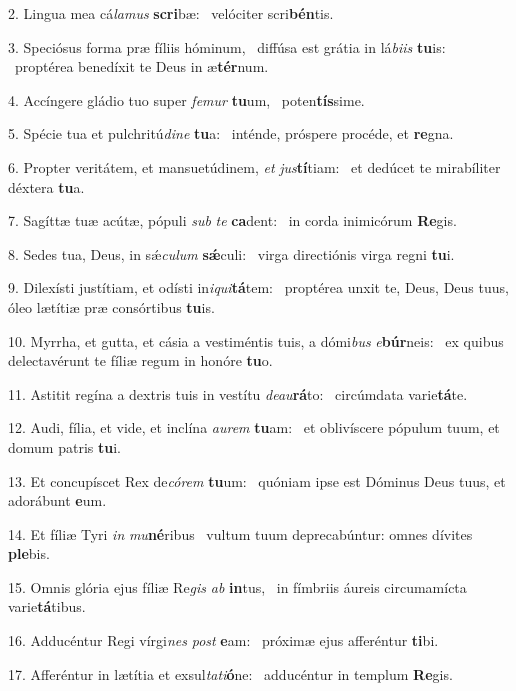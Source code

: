 2. Lingua mea cá\textit{la}\textit{mus} \textbf{scri}bæ: \ast\  velóciter scri\textbf{bén}tis.\

3. Speciósus forma præ fíliis hóminum, \dag\  diffúsa est grátia in lá\textit{bi}\textit{is} \textbf{tu}is: \ast\  proptérea benedíxit te Deus in æ\textbf{tér}num.\

4. Accíngere gládio tuo super \textit{fe}\textit{mur} \textbf{tu}um, \ast\  poten\textbf{tís}sime.\

5. Spécie tua et pulchritú\textit{di}\textit{ne} \textbf{tu}a: \ast\  inténde, próspere procéde, et \textbf{re}gna.\

6. Propter veritátem, et mansuetúdinem, \textit{et} \textit{jus}\textbf{tí}tiam: \ast\  et dedúcet te mirabíliter déxtera \textbf{tu}a.\

7. Sagíttæ tuæ acútæ, pópuli \textit{sub} \textit{te} \textbf{ca}dent: \ast\  in corda inimicórum \textbf{Re}gis.\

8. Sedes tua, Deus, in sǽ\textit{cu}\textit{lum} \textbf{sǽ}culi: \ast\  virga directiónis virga regni \textbf{tu}i.\

9. Dilexísti justítiam, et odísti in\textit{i}\textit{qui}\textbf{tá}tem: \ast\  proptérea unxit te, Deus, Deus tuus, óleo lætítiæ præ consórtibus \textbf{tu}is.\

10. Myrrha, et gutta, et cásia a vestiméntis tuis, a dómi\textit{bus} \textit{e}\textbf{búr}neis: \ast\  ex quibus delectavérunt te fíliæ regum in honóre \textbf{tu}o.\

11. Astitit regína a dextris tuis in vestítu \textit{de}\textit{au}\textbf{rá}to: \ast\  circúmdata varie\textbf{tá}te.\

12. Audi, fília, et vide, et inclína \textit{au}\textit{rem} \textbf{tu}am: \ast\  et oblivíscere pópulum tuum, et domum patris \textbf{tu}i.\

13. Et concupíscet Rex de\textit{có}\textit{rem} \textbf{tu}um: \ast\  quóniam ipse est Dóminus Deus tuus, et adorábunt \textbf{e}um.\

14. Et fíliæ Tyri \textit{in} \textit{mu}\textbf{né}ribus \ast\  vultum tuum deprecabúntur: omnes dívites \textbf{ple}bis.\

15. Omnis glória ejus fíliæ Re\textit{gis} \textit{ab} \textbf{in}tus, \ast\  in fímbriis áureis circumamícta varie\textbf{tá}tibus.\

16. Adducéntur Regi vírgi\textit{nes} \textit{post} \textbf{e}am: \ast\  próximæ ejus afferéntur \textbf{ti}bi.\

17. Afferéntur in lætítia et exsul\textit{ta}\textit{ti}\textbf{ó}ne: \ast\  adducéntur in templum \textbf{Re}gis.\

